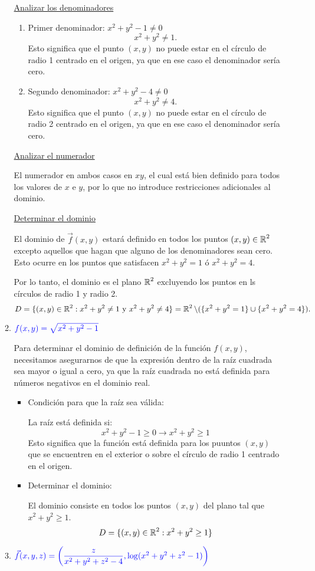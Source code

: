 \begin{enumerate}[label=\color{red}\textbf{\arabic*)}, leftmargin=*]
\begin{enumerate}[label=\color{red}\textbf{\alph*)}]
\underline{Analizar los denominadores}
\begin{enumerate}[label=\arabic*)]
\item Primer denominador: $x^2+y^2-1\neq0$ $$x^2+y^2\neq1.$$
Esto significa que el punto $(x,y)$ no puede estar en el círculo de radio 1 centrado en el origen, ya que en ese caso el denominador sería cero.
\item Segundo denominador: $x^2+y^2-4\neq0$ $$x^2+y^2\neq4.$$
Esto significa que el punto $(x,y)$ no puede estar en el círculo de radio 2 centrado en el origen, ya que en ese caso el denominador sería cero.
\end{enumerate}
\underline{Analizar el numerador}

El numerador en ambos casos en $xy$, el cual está bien definido para todos los valores de $x$ e $y$, por lo que no introduce restricciones adicionales al dominio.

\underline{Determinar el dominio}

El dominio de $\vec{f}(x,y)$ estará definido en todos los puntos $(x,y)\in\operatorname{\mathbb{R}}^2$ excepto aquellos que hagan que alguno de los denominadores sean cero. Esto ocurre en los puntos que satisfacen $x^2+y^2=1$ ó $x^2+y^2=4$.

Por lo tanto, el dominio es el plano $\operatorname{\mathbb{R}}^2$ excluyendo los puntos en ls círculos de radio 1 y radio 2.
$$
D=\{(x,y)\in\operatorname{\mathbb{R}}^2:x^2+y^2\neq1\text{ y }x^2+y^2\neq4\}=\operatorname{\mathbb{R}}^2\backslash(\{x^2+y^2=1\}\cup\{x^2+y^2=4\}).
$$

\item $\textcolor{blue}{f(x,y)=\sqrt{x^2+y^2-1}}$

Para determinar el dominio de definición de la función $f(x,y)$, necesitamos asegurarnos de que la expresión dentro de la raíz cuadrada sea mayor o igual a cero, ya que la raíz cuadrada no está definida para números negativos en el dominio real.

\begin{itemize}
\item Condición para que la raíz sea válida:

La raíz está definida si: $$x^2+y^2-1\ge0\longrightarrow x^2+y^2\ge1$$
Esto significa que la función está definida para los puuntos $(x,y)$ que se encuentren en el exterior o sobre el círculo de radio 1 centrado en el origen.

\item Determinar el dominio:

El dominio consiste en todos los puntos $(x,y)$ del plano tal que $x^2+y^2\ge1$. $$D=\{(x,y)\in\operatorname{\mathbb{R}}^2:x^2+y^2\ge1\}$$
\end{itemize}
\item $\textcolor{blue}{\vec{f}(x,y,z)=\left(\dfrac{z}{x^2+y^2+z^2-4},\log(x^2+y^2+z^2-1)\right)}$


\end{enumerate}
\end{enumerate}
